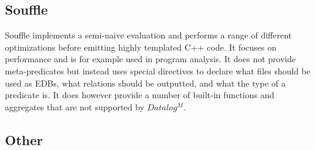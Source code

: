 \subsection{Souffle}
Souffle implements a semi-naive evaluation\cite{Green:2013:DRQ:2688167.2688168} and performs a range of different optimizations before emitting highly templated C++ code\cite{Scholz:2016:FLP:2892208.2892226}. It focuses on performance and is for example used in program analysis\cite{Smaragdakis:2010:UDF:2185923.2185939}. It does not provide meta-predicates but instead uses special directives to declare what files should be used as EDBs, what relations should be outputted, and what the type of a predicate is. It does however provide a number of built-in functions and aggregates that are not supported by $Datalog^M$\cite{SouffleHome}.

\subsection{Other}
